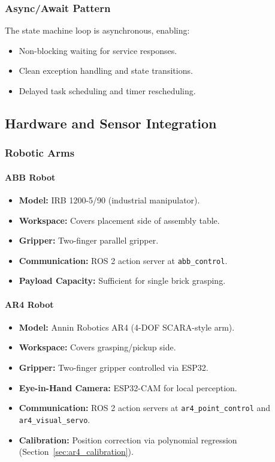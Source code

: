 \subsubsection{Async/Await Pattern}

The state machine loop is asynchronous, enabling:
\begin{itemize}
    \item Non-blocking waiting for service responses.
    \item Clean exception handling and state transitions.
    \item Delayed task scheduling and timer rescheduling.
\end{itemize}

\subsection{Hardware and Sensor Integration}

\subsubsection{Robotic Arms}

\paragraph{ABB Robot}
\begin{itemize}
    \item \textbf{Model:} IRB 1200-5/90 (industrial manipulator).
    \item \textbf{Workspace:} Covers placement side of assembly table.
    \item \textbf{Gripper:} Two-finger parallel gripper.
    \item \textbf{Communication:} ROS 2 action server at \texttt{abb\_control}.
    \item \textbf{Payload Capacity:} Sufficient for single brick grasping.
\end{itemize}

\paragraph{AR4 Robot}
\begin{itemize}
    \item \textbf{Model:} Annin Robotics AR4 (4-DOF SCARA-style arm).
    \item \textbf{Workspace:} Covers grasping/pickup side.
    \item \textbf{Gripper:} Two-finger gripper controlled via ESP32.
    \item \textbf{Eye-in-Hand Camera:} ESP32-CAM for local perception.
    \item \textbf{Communication:} ROS 2 action servers at \texttt{ar4\_point\_control} and \texttt{ar4\_visual\_servo}.
    \item \textbf{Calibration:} Position correction via polynomial regression (Section~\ref{sec:ar4_calibration}).
\end{itemize}

